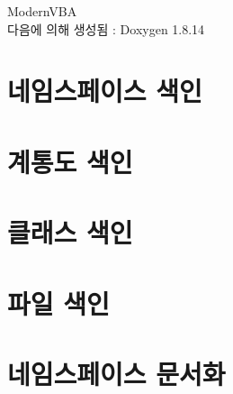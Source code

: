 \documentclass[twoside]{book}
\newcommand{\+}{\discretionary{\mbox{\scriptsize$\hookleftarrow$}}{}{}}
\newcommand{\clearemptydoublepage}{%
  \newpage{\pagestyle{empty}\cleardoublepage}%
}
\begin{document}
\hypersetup{pageanchor=false,
             bookmarksnumbered=true,
             pdfencoding=unicode
            }
\begin{titlepage}
\vspace*{7cm}
\begin{center}%
{\Large Modern\+V\+BA }\\
\vspace*{1cm}
{\large 다음에 의해 생성됨 \+:  Doxygen 1.8.14}\\
\end{center}
\end{titlepage}
\clearemptydoublepage
{}
\tableofcontents
\clearemptydoublepage
{}
\hypersetup{pageanchor=true}

\chapter{네임스페이스 색인}

\chapter{계통도 색인}

\chapter{클래스 색인}

\chapter{파일 색인}

\chapter{네임스페이스 문서화}






\end{document}
